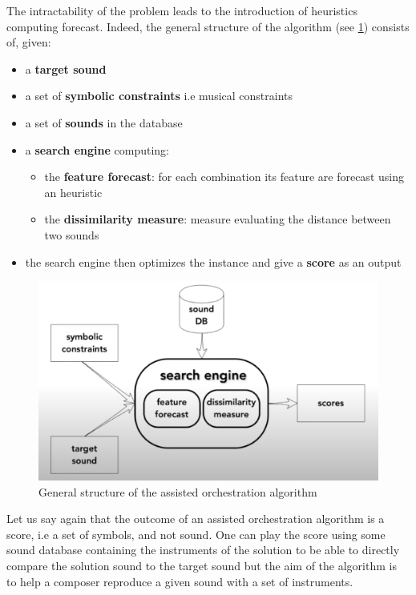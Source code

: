 \documentclass[a4paper]{book}
\begin{document}
The intractability of the problem leads to the introduction of heuristics computing forecast. 
Indeed, the general structure of the algorithm (see \ref{fig:generalstructstat}) consists of, given:
\begin{itemize}
    \item a \textbf{target sound}
    \item a set of \textbf{symbolic constraints} i.e musical constraints
    \item a set of \textbf{sounds} in the database
    \item a \textbf{search engine} computing:
    \begin{itemize}
        \item the \textbf{feature forecast}: for each combination its feature are forecast using an heuristic
        \item the \textbf{dissimilarity measure}: measure evaluating the distance between two sounds 
    \end{itemize}
    \item the search engine then optimizes the instance and give a \textbf{score} as an output
\end{itemize}

\begin{figure}[h!]
\centering
\includegraphics[scale=0.4]{generalstructstat.png}
\caption{General structure of the assisted orchestration algorithm}
\label{fig:generalstructstat}
\end{figure}

Let us say again that the outcome of an assisted orchestration algorithm is a score, i.e a set of symbols, and not sound. One can play the score using some sound database containing the instruments of the solution to be able to directly compare the solution sound to the target sound but the aim of the algorithm is to help a composer reproduce a given sound with a set of instruments.\\
\end{document}
